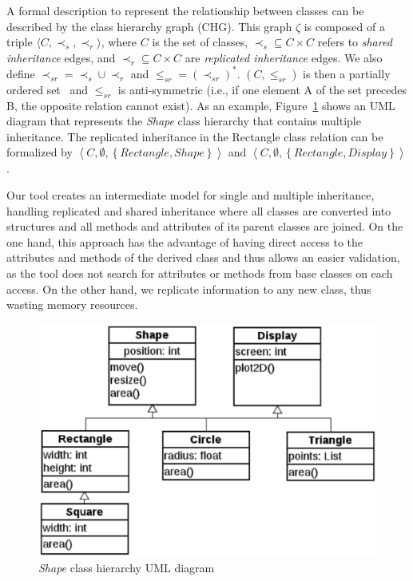 \documentclass[conference]{IEEEtran}
\begin{document}
A formal description to represent
the relationship between classes can be described by the class hierarchy graph
(CHG). This graph $\zeta$ is composed of a triple
$\langle \mathit{C}, \prec_{s}, \prec_{r}\rangle$,
where $\mathit{C}$ is the set of classes,
$\prec_s \subseteq C \times C$ refers to \textit{shared inheritance} edges,
and $\prec_r\subseteq C \times C$ are \textit{replicated inheritance} edges.
We also define $\prec_{sr} = \prec_s \cup \prec_r$ and $\leq_{sr} = (\prec_{sr})^*$.
$\left( \mathit{C}, \leq_{sr} \right)$ is then a partially ordered set~\cite{Neggers99}
and $\leq_{sr}$ is anti-symmetric (i.e., if one element A of the set precedes B,
the opposite relation cannot exist).
%
As an example, Figure~\ref{figure:uml_diagram} shows an UML diagram
that represents the \textit{Shape} class hierarchy that contains multiple inheritance.
The replicated inheritance in the Rectangle class relation can be formalized by
$\left\langle C, \emptyset,\left\{ Rectangle, Shape \right\} \right\rangle$ and
$\left\langle C, \emptyset, \left\{ Rectangle, Display \right\} \right\rangle $.

Our tool creates an intermediate model for single and multiple inheritance, handling
replicated and shared inheritance where all classes are converted into structures and all
methods and attributes of its parent classes are joined. On the one hand, this approach has
the advantage of having direct access to the attributes and methods
of the derived class and thus allows an easier validation, as the tool
does not search for attributes or methods from base classes on each access.
On the other hand, we replicate information to any new class, thus wasting
memory resources.

\begin{figure}[ht]
\centering
\includegraphics[scale=0.28]{figures/inheritance_uml}
\caption{\textit{Shape} class hierarchy UML diagram}
\label{figure:uml_diagram}
\end{figure}
\end{document}
